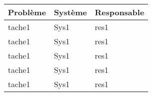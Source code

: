 \Large\begin{tabularx}{\linewidth}{
    |>{\hsize=2.0\hsize}X|%
    >{\hsize=1.2\hsize}X|%
    >{\hsize=0.6\hsize}X|%
  }
    \hline
    Problème & Système & Responsable \\\hline
    tache1 & Sys1 & res1 \\\hline
    tache1 & Sys1 & res1 \\\hline
    tache1 & Sys1 & res1 \\\hline
    tache1 & Sys1 & res1 \\\hline
    tache1 & Sys1 & res1 \\\hline
  \end{tabularx}
     